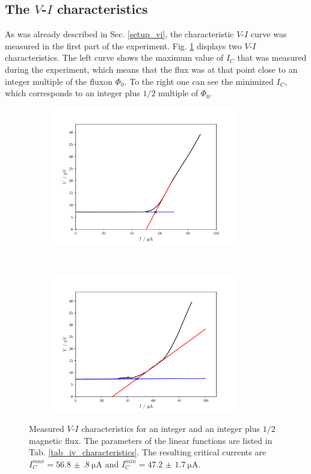 \documentclass[a4paper,10pt]{article}
\begin{document}
\subsection{The $V$-$I$ characteristics}
As was already described in Sec. \ref{setup_vi}, the characteristic $V$-$I$ curve was measured in the first part of the experiment. Fig. \ref{fig_iv_characteristics} displays two $V$-$I$ characteristics. The left curve shows the maximum value of $I_C$ that was measured during the experiment, which means that the flux was at that point close to an integer multiple of the fluxon $\Phi_0$. To the right one can see the minimized $I_C$, which corresponds to an integer plus $1/2$ multiple of $\Phi_0$. \\
\begin{figure}[htp!]
    \centering
    \begin{subfigure}[t]{0.45 \textwidth}
        \centering
        \includegraphics[height=6cm]{iv_max.pdf}
        \caption{ }
    \end{subfigure}
    ~ 
    \begin{subfigure}[t]{0.45 \textwidth}
        \centering
        \includegraphics[height=6cm]{iv_min.pdf}
        \caption{ }
    \end{subfigure}
    \caption{Measured $V$-$I$ characteristics for an integer and an integer plus $1/2$ magnetic flux. The parameters of the linear functions are listed in Tab. \ref{tab_iv_characteristics}. The resulting critical currents are $I_C^{max} = \SI{56.8(8)}{\micro \ampere}$ and $I_C^{min} = \SI{47.2(17)}{\micro \ampere}$. }
    \label{fig_iv_characteristics}
\end{figure}
\end{document}
